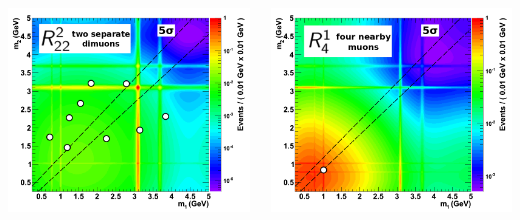 \documentclass[compress]{beamer}
\begin{document}
\begin{frame}
\begin{columns}
\centering \includegraphics[width=0.9\linewidth]{b1_2dpdf.png}

\centering \includegraphics[width=0.9\linewidth]{a2_2dpdf.png}
\end{columns}
\end{frame}
\end{document}
